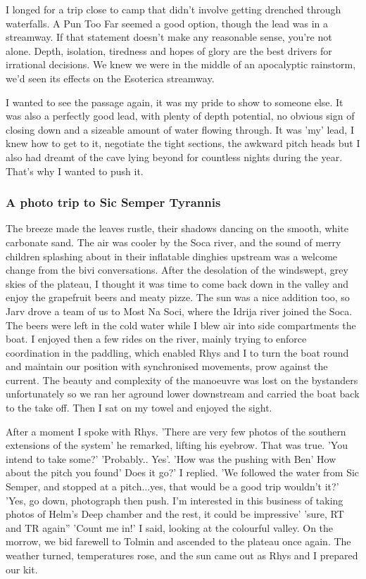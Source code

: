 \documentclass[onecolumn]{book}
\begin{document}
I longed for a trip close to camp that didn't involve getting drenched through waterfalls. A Pun Too Far seemed a good option, though the lead was in a streamway. If that statement doesn't make any reasonable sense, you're not alone. Depth, isolation, tiredness and hopes of glory are the best drivers for irrational decisions. We knew we were in the middle of an apocalyptic rainstorm, we'd seen its effects on the Esoterica streamway. 

I wanted to see the passage again, it was my pride to show to someone else. It was also a perfectly good lead, with plenty of depth potential, no obvious sign of closing down and a sizeable amount of water flowing through. It was 'my' lead, I knew how to get to it, negotiate the tight sections, the awkward pitch heads but I also had dreamt of the cave lying beyond for countless nights during the year. That's why I wanted to push it.



\subsubsection{A photo trip to Sic Semper Tyrannis}
The breeze made the leaves rustle, their shadows dancing on the smooth, white carbonate sand. The air was cooler by the Soca river, and the sound of merry children splashing about in their inflatable dinghies upstream was a welcome change from the bivi conversations. 
After the desolation of the windswept, grey skies of the plateau, I thought it was time to come back down in the valley and enjoy the grapefruit beers and meaty pizze. The sun was a nice addition too, so Jarv drove a team of us to Most Na Soci, where the Idrija river joined the Soca. The beers were left in the cold water while I blew air into side compartments the boat. 
I enjoyed then a few rides on the river, mainly trying to enforce coordination in the paddling, which enabled Rhys and I to turn the boat round and maintain our position with synchronised movements, prow against the current. The beauty and complexity of the manoeuvre was lost on the bystanders unfortunately so we ran her aground lower downstream and carried the boat back to the take off. Then I sat on my towel and enjoyed the sight.

After a moment I spoke with Rhys. 
'There are very few photos of the southern extensions of the system' he remarked, lifting his eyebrow.  That was true. 'You intend to take some?' 
'Probably.. Yes'. 
'How was the pushing with Ben' How about the pitch you found' Does it go?' I replied.
'We followed the water from Sic Semper, and stopped at a pitch...yes, that would be a good trip wouldn't it?'
'Yes, go down, photograph then push. I'm interested in this business of taking photos of Helm's Deep chamber and the rest, it could be impressive'
'sure, RT and TR again''
'Count me in!' I said, looking at the colourful valley. On the morrow, we bid farewell to Tolmin and ascended to the plateau once again. The weather turned, temperatures rose, and the sun came out as Rhys and I prepared our kit.
\end{document}
